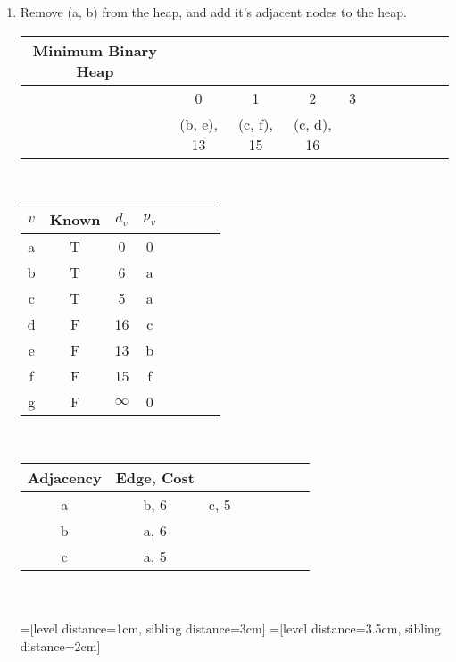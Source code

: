 \documentclass[11pt]{article}
\begin{document}
\begin{enumerate}
\begin{enumerate}
\item Remove (a, b) from the heap, and add it's adjacent nodes to the heap.\\
\begin{tabular}{ccccccccccc}
Minimum Binary Heap\\\hline
&0&1&2&3\\
& (b, e), 13& (c, f), 15& (c, d), 16\\
\end{tabular}\\
\begin{tabular}{c|ccccccc|}
$v$& Known& $d_v$ & $p_v$\\\hline
a& T & 0& 0\\
b&T & 6 & a\\
c&T & 5 & a\\
d&F & 16 & c\\
e&F & 13 & b\\
f&F & 15 & f\\
g&F & $\infty$ & 0
\end{tabular}\\
\begin{tabular}{c|ccccccc|}
Adjacency& Edge, Cost\\\hline
a& b, 6 & c, 5\\
b&a, 6&\\
c&a, 5&\\
\end{tabular}\\
\\
=[level distance=1cm, sibling distance=3cm]
=[level distance=3.5cm, sibling distance=2cm]



\end{enumerate}
\end{enumerate}
\end{document}
